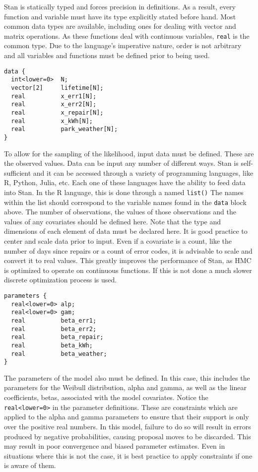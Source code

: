 Stan is statically typed and forces precision in definitions. As a result, every function and variable must have its type explicitly stated before hand. Most common data types are available, including ones for dealing with vector and matrix operations. As these functions deal with continuous variables, \lstinline{real} is the common type. Due to the language's imperative nature, order is not arbitrary and all variables and functions must be defined prior to being used. 


\begin{lstlisting}
data {
  int<lower=0>  N;
  vector[2]     lifetime[N];
  real          x_err1[N];
  real          x_err2[N];
  real          x_repair[N];
  real          x_kWh[N];
  real          park_weather[N];
}
\end{lstlisting}


To allow for the sampling of the likelihood, input data must be defined. These are the observed values. Data can be input any number of different ways. Stan is self-sufficient and it can be accessed through a variety of programming languages, like R, Python, Julia, etc. Each one of these languages have the ability to feed data into Stan. In the R language, this is done through a named \lstinline{list()} The names within the list should correspond to the variable names found in the \lstinline{data} block above. The number of observations, the values of those observations and the values of any covariates should be defined here. Note that the type and dimensions of each element of data must be declared here. It is good practice to center and scale data prior to input. Even if a covariate is a count, like the number of days since repairs or a count of error codes, it is advisable to scale and convert it to real values. This greatly improves the performance of Stan, as HMC is optimized to operate on continuous functions. If this is not done a much slower discrete optimization process is used. 



\begin{lstlisting}
parameters {
  real<lower=0> alp;
  real<lower=0> gam;
  real          beta_err1;
  real          beta_err2;
  real          beta_repair;
  real          beta_kWh;
  real          beta_weather;
}
\end{lstlisting}


The parameters of the model also must be defined. In this case, this includes the parameters for the Weibull distribution, alpha and gamma, as well as the linear coefficients, betas, associated with the model covariates. Notice the \lstinline{real<lower=0>} in the parameter definitions. These are constraints which are applied to the alpha and gamma parameters to ensure that their support is only over the positive real numbers. In this model, failure to do so will result in errors produced by negative probabilities, causing proposal moves to be discarded. This may result in poor convergence and biased parameter estimates. Even in situations where this is not the case, it is best practice to apply constraints if one is aware of them.


